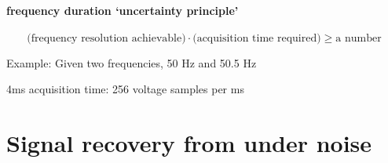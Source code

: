 \documentclass{article}
\begin{document}
\paragraph*{frequency duration `uncertainty principle'}

\[\textrm{(frequency resolution achievable)} \cdot \textrm{(acquisition time required)} \geq  \textrm{a number}\]

Example: Given two frequencies, 50 Hz and 50.5 Hz

4ms acquisition time: 256 voltage samples per ms

\newpage
\section*{Signal recovery from under noise}
\end{document}
